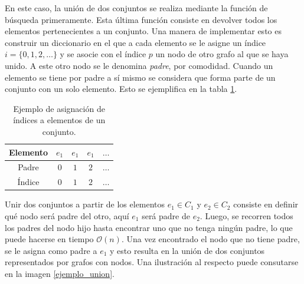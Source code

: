 \documentclass[paper=leter, fontsize=11pt]{scrartcl}
\numberwithin{equation}{section}		%
\numberwithin{figure}{section}			%
\numberwithin{table}{section}				%
\begin{document}
En este caso, la unión de dos conjuntos se realiza mediante la función de búsqueda primeramente. Esta última función consiste en devolver todos los elementos pertenecientes a un conjunto. Una manera de implementar esto es construir un diccionario en el que a cada elemento se le asigne un índice $i = \{0, 1, 2, \ldots\}$ y se asocie con el índice $p$ un nodo de otro grafo al que se haya unido. A este otro nodo se le denomina \textit{padre}, por comodidad. Cuando un elemento se tiene por padre a sí mismo se considera que forma parte de un conjunto con un solo elemento. Esto se ejemplifica en la tabla \ref{asignacion}.

\begin{table}[]
    \centering
    \caption{Ejemplo de asignación de índices a elementos de un conjunto.}
    \label{asignacion}
    \begin{tabular}{@{}ccccc@{}}
    \toprule
    Elemento & $e_1$ & $e_1$ & $e_1$ & $\ldots$ \\ \midrule
    Padre   & $0$     & $1$     & $2$     & $\ldots$ \\ \bottomrule
    Índice   & $0$     & $1$     & $2$     & $\ldots$ \\ \bottomrule
    \end{tabular}
\end{table}

Unir dos conjuntos a partir de los elementos $e_1 \in C_1$ y $e_2 \in C_2$ consiste en definir qué nodo será padre del otro, aquí $e_1$ será padre de $e_2$. Luego, se recorren todos los padres del nodo hijo hasta encontrar uno que no tenga ningún padre, lo que puede hacerse en tiempo $\mathcal{O}(n)$. Una vez encontrado el nodo que no tiene padre, se le asigna como padre a $e_1$ y esto resulta en la unión de dos conjuntos representados por grafos con nodos. Una ilustración al respecto puede consutarse en la imagen \ref{ejemplo_union}.
\end{document}
